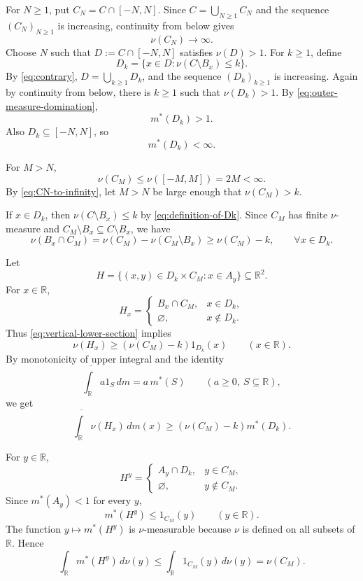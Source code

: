 \documentclass{amsart}
\theoremstyle{plain}
\theoremstyle{definition}
\newcommand{\R}{\mathbb{R}}
\begin{document}
For $N\ge1$, put $C_N=C\cap[-N,N]$.
Since $C=\bigcup_{N\ge1}C_N$ and the sequence $(C_N)_{N\ge1}$ is increasing, continuity from below gives
\begin{equation}\label{eq:CN-to-infinity}
\nu(C_N)\longrightarrow\infty.
\end{equation}
Choose $N$ such that $D:=C\cap[-N,N]$ satisfies $\nu(D)>1$.
For $k\ge1$, define
\begin{equation}\label{eq:definition-of-Dk}
D_k=\{x\in D:\nu(C\setminus B_x)\le k\}.
\end{equation}
By \eqref{eq:contrary}, $D=\bigcup_{k\ge1}D_k$, and the sequence $(D_k)_{k\ge1}$ is increasing.
Again by continuity from below, there is $k\ge1$ such that $\nu(D_k)>1$.
By \eqref{eq:outer-measure-domination},
\begin{equation}\label{eq:Dk-large-outer}
m^*(D_k)>1.
\end{equation}
Also $D_k\subseteq[-N,N]$, so
\begin{equation}\label{eq:Dk-finite-outer}
m^*(D_k)<\infty.
\end{equation}

For $M>N$,
\[
\nu(C_M)\le\nu([-M,M])=2M<\infty.
\]
By \eqref{eq:CN-to-infinity}, let $M>N$ be large enough that $\nu(C_M)>k$.

If $x\in D_k$, then $\nu(C\setminus B_x)\le k$ by \eqref{eq:definition-of-Dk}.
Since $C_M$ has finite $\nu$-measure and $C_M\setminus B_x\subseteq C\setminus B_x$, we have
\begin{equation}\label{eq:vertical-lower-section}
\nu(B_x\cap C_M)
=
\nu(C_M)-\nu(C_M\setminus B_x)
\ge
\nu(C_M)-k,
\qquad
\forall x\in D_k.
\end{equation}

Let
\[
H=\{(x,y)\in D_k\times C_M:x\in A_y\}\subseteq\R^2.
\]
For $x\in\R$,
\[
H_x=
\begin{cases}
B_x\cap C_M, & x\in D_k,\\
\varnothing, & x\notin D_k.
\end{cases}
\]
Thus \eqref{eq:vertical-lower-section} implies
\[
\nu(H_x)\ge(\nu(C_M)-k)1_{D_k}(x)
\qquad(x\in\R).
\]
By monotonicity of upper integral and the identity
\[
\overline{\int_\R} a1_S\,dm=a\,m^*(S)
\qquad(a\ge0,
\ S\subseteq\R),
\]
we get
\begin{equation}\label{eq:left-lower}
\overline{\int_\R}\nu(H_x)\,dm(x)
\ge
(\nu(C_M)-k)m^*(D_k).
\end{equation}

For $y\in\R$,
\[
H^y=
\begin{cases}
A_y\cap D_k, & y\in C_M,\\
\varnothing, & y\notin C_M.
\end{cases}
\]
Since $m^*(A_y)<1$ for every $y$,
\[
m^*(H^y)
\le
1_{C_M}(y)
\qquad(y\in\R).
\]
The function $y\mapsto m^*(H^y)$ is $\nu$-measurable because $\nu$ is defined on all subsets of $\R$.
Hence
\begin{equation}\label{eq:right-upper}
\int_\R m^*(H^y)\,d\nu(y)
\le
\int_\R 1_{C_M}(y)\,d\nu(y)
=
\nu(C_M).
\end{equation}
\end{document}
